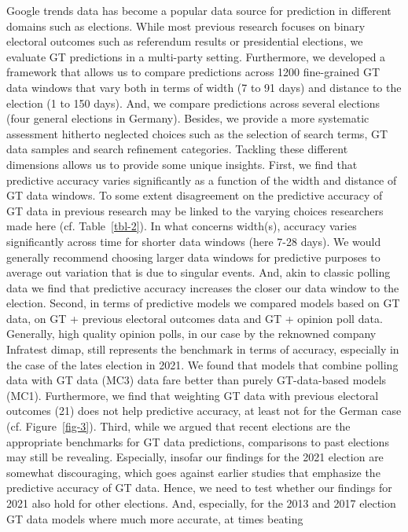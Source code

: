 \documentclass[
  letterpaper,
  DIV=11,
  numbers=noendperiod]{scrartcl}
\begin{document}
Google trends data has become a popular data source for prediction in
different domains such as elections. While most previous research
focuses on binary electoral outcomes such as referendum results or
presidential elections, we evaluate GT predictions in a multi-party
setting. Furthermore, we developed a framework that allows us to compare
predictions across 1200 fine-grained GT data windows that vary both in
terms of width (7 to 91 days) and distance to the election (1 to 150
days). And, we compare predictions across several elections (four
general elections in Germany). Besides, we provide a more systematic
assessment hitherto neglected choices such as the selection of search
terms, GT data samples and search refinement categories. Tackling these
different dimensions allows us to provide some unique insights. First,
we find that predictive accuracy varies significantly as a function of
the width and distance of GT data windows. To some extent disagreement
on the predictive accuracy of GT data in previous research may be linked
to the varying choices researchers made here (cf. Table~\ref{tbl-2}). In
what concerns width(s), accuracy varies significantly across time for
shorter data windows (here 7-28 days). We would generally recommend
choosing larger data windows for predictive purposes to average out
variation that is due to singular events. And, akin to classic polling
data we find that predictive accuracy increases the closer our data
window to the election. Second, in terms of predictive models we
compared models based on GT data, on GT + previous electoral outcomes
data and GT + opinion poll data. Generally, high quality opinion polls,
in our case by the reknowned company Infratest dimap, still represents
the benchmark in terms of accuracy, especially in the case of the lates
election in 2021. We found that models that combine polling data with GT
data (MC3) data fare better than purely GT-data-based models (MC1).
Furthermore, we find that weighting GT data with previous electoral
outcomes (21) does not help predictive accuracy, at least not for the
German case (cf. Figure~\ref{fig-3}). Third, while we argued that recent
elections are the appropriate benchmarks for GT data predictions,
comparisons to past elections may still be revealing. Especially,
insofar our findings for the 2021 election are somewhat discouraging,
which goes against earlier studies that emphasize the predictive
accuracy of GT data. Hence, we need to test whether our findings for
2021 also hold for other elections. And, especially, for the 2013 and
2017 election GT data models where much more accurate, at times beating
\end{document}
